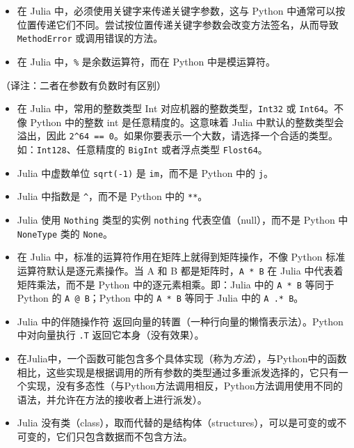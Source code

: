 \begin{itemize}
\item 在 Julia 中，必须使用关键字来传递关键字参数，这与 Python 中通常可以按位置传递它们不同。尝试按位置传递关键字参数会改变方法签名，从而导致 \texttt{MethodError} 或调用错误的方法。


\item 在 Julia 中，\texttt{\%} 是余数运算符，而在 Python 中是模运算符。

\end{itemize}


（译注：二者在参数有负数时有区别）



\begin{itemize}
\item 在 Julia 中，常用的整数类型 Int 对应机器的整数类型，\texttt{Int32} 或 \texttt{Int64}。不像 Python 中的整数 int 是任意精度的。这意味着 Julia 中默认的整数类型会溢出，因此 \texttt{2{\textasciicircum}64 == 0}。如果你要表示一个大数，请选择一个合适的类型。如：\texttt{Int128}、任意精度的 \texttt{BigInt} 或者浮点类型 \texttt{Flost64}。


\item Julia 中虚数单位 \texttt{sqrt(-1)} 是 \texttt{im}，而不是 Python 中的 \texttt{j}。


\item Julia 中指数是 \texttt{{\textasciicircum}}，而不是 Python 中的 \texttt{**}。


\item Julia 使用 \texttt{Nothing} 类型的实例 \texttt{nothing} 代表空值（null），而不是 Python 中 \texttt{NoneType} 类的 \texttt{None}。


\item 在 Julia 中，标准的运算符作用在矩阵上就得到矩阵操作，不像 Python 标准运算符默认是逐元素操作。当 A 和 B 都是矩阵时，\texttt{A * B} 在 Julia 中代表着矩阵乘法，而不是 Python 中的逐元素相乘。即：Julia 中的 \texttt{A * B} 等同于 Python 的 \texttt{A @ B}；Python 中的 \texttt{A * B} 等同于 Julia 中的 \texttt{A .* B}。


\item Julia 中的伴随操作符 \texttt{{\textquotesingle}} 返回向量的转置（一种行向量的懒惰表示法）。Python 中对向量执行 \texttt{.T} 返回它本身（没有效果）。


\item 在Julia中，一个函数可能包含多个具体实现（称为\emph{方法}），与Python中的函数相比，这些实现是根据调用的所有参数的类型通过多重派发选择的，它只有一个实现，没有多态性（与Python方法调用相反，Python方法调用使用不同的语法，并允许在方法的接收者上进行派发）。


\item Julia 没有类（class），取而代替的是结构体（structures），可以是可变的或不可变的，它们只包含数据而不包含方法。

\end{itemize}


